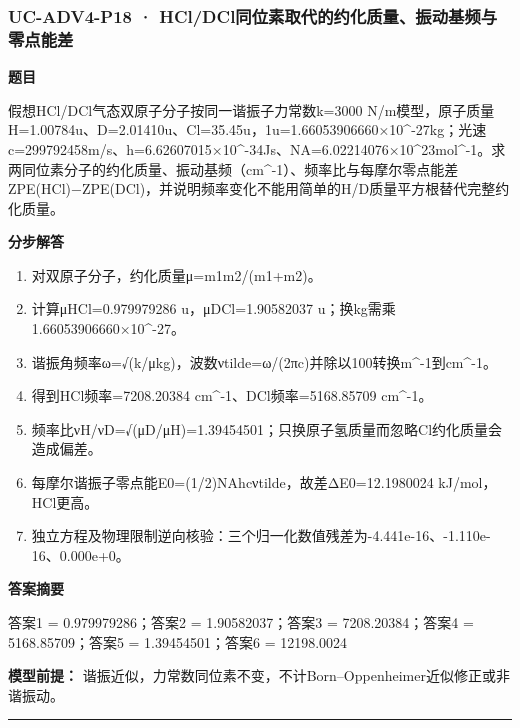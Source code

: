 \documentclass[UTF8,11pt,a4paper]{ctexart}
\begin{document}
\subsubsection*{UC-ADV4-P18 · HCl/DCl同位素取代的约化质量、振动基频与零点能差}
\noindent\textbf{题目}\par
假想HCl/DCl气态双原子分子按同一谐振子力常数k=3000 N/m模型，原子质量H=1.00784u、D=2.01410u、Cl=35.45u，1u=1.66053906660×10\textasciicircum{}-27kg；光速c=299792458m/s、h=6.62607015×10\textasciicircum{}-34Js、NA=6.02214076×10\textasciicircum{}23mol\textasciicircum{}-1。求两同位素分子的约化质量、振动基频（cm\textasciicircum{}-1）、频率比与每摩尔零点能差ZPE(HCl)−ZPE(DCl)，并说明频率变化不能用简单的H/D质量平方根替代完整约化质量。\par
\medskip\noindent\textbf{分步解答}
\begin{enumerate}
\item 对双原子分子，约化质量μ=m1m2/(m1+m2)。
\item 计算μHCl=0.979979286 u，μDCl=1.90582037 u；换kg需乘1.66053906660×10\textasciicircum{}-27。
\item 谐振角频率ω=√(k/μkg)，波数νtilde=ω/(2πc)并除以100转换m\textasciicircum{}-1到cm\textasciicircum{}-1。
\item 得到HCl频率=7208.20384 cm\textasciicircum{}-1、DCl频率=5168.85709 cm\textasciicircum{}-1。
\item 频率比νH/νD=√(μD/μH)=1.39454501；只换原子氢质量而忽略Cl约化质量会造成偏差。
\item 每摩尔谐振子零点能E0=(1/2)NAhcνtilde，故差ΔE0=12.1980024 kJ/mol，HCl更高。
\item 独立方程及物理限制逆向核验：三个归一化数值残差为-4.441e-16、-1.110e-16、0.000e+0。
\end{enumerate}
\noindent\textbf{答案摘要}\par
答案1 = 0.979979286；答案2 = 1.90582037；答案3 = 7208.20384；答案4 = 5168.85709；答案5 = 1.39454501；答案6 = 12198.0024\par
\noindent\textbf{模型前提：}
谐振近似，力常数同位素不变，不计Born–Oppenheimer近似修正或非谐振动。\par
\medskip\hrule\medskip
\end{document}
